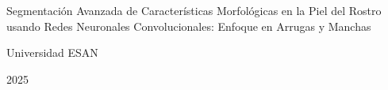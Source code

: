 \begin{center}
	{Segmentación Avanzada de Características Morfológicas en la Piel del Rostro usando Redes Neuronales Convolucionales: Enfoque en Arrugas y Manchas}
\end{center}

\leftline{-------------}
\vspace{3cm}

\rightline{\fillin[9cm]}
\vspace{3cm}

\rightline{\fillin[9cm]}
\vspace{3cm}


\centerline{Universidad ESAN}
\centerline{2025}